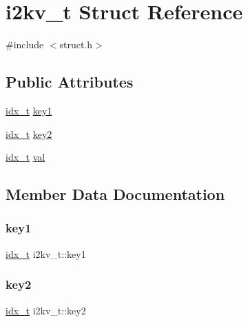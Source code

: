 \hypertarget{a00746}{}\section{i2kv\+\_\+t Struct Reference}
\label{a00746}


{\ttfamily \#include $<$struct.\+h$>$}

\subsection*{Public Attributes}
\begin{DoxyCompactItemize}
\item 
\hyperlink{a00876_aaa5262be3e700770163401acb0150f52}{idx\+\_\+t} \hyperlink{a00746_a8a1d36b378c883ebbfaea2702ab30160}{key1}
\item 
\hyperlink{a00876_aaa5262be3e700770163401acb0150f52}{idx\+\_\+t} \hyperlink{a00746_a431cab38e5c7ed64f569f5df89b1f2bc}{key2}
\item 
\hyperlink{a00876_aaa5262be3e700770163401acb0150f52}{idx\+\_\+t} \hyperlink{a00746_a713071e870631537fdc2e95b01c00176}{val}
\end{DoxyCompactItemize}


\subsection{Member Data Documentation}
\mbox{\label{a00746_a8a1d36b378c883ebbfaea2702ab30160}} 
\subsubsection{\texorpdfstring{key1}{key1}}
{\footnotesize\ttfamily \hyperlink{a00876_aaa5262be3e700770163401acb0150f52}{idx\+\_\+t} i2kv\+\_\+t\+::key1}

\mbox{\label{a00746_a431cab38e5c7ed64f569f5df89b1f2bc}} 
\subsubsection{\texorpdfstring{key2}{key2}}
{\footnotesize\ttfamily \hyperlink{a00876_aaa5262be3e700770163401acb0150f52}{idx\+\_\+t} i2kv\+\_\+t\+::key2}

\mbox{\label{a00746_a713071e870631537fdc2e95b01c00176}} 
